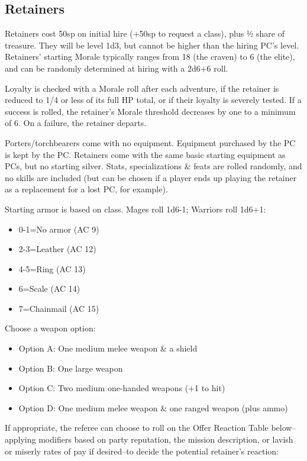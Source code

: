 \documentclass{article}
\begin{document}
\begin{multicols}{2}
\subsection{Retainers}\label{retainers}

Retainers cost 50sp on initial hire (+50sp to request a class), plus ½
share of treasure. They will be level 1d3, but cannot be higher than the
hiring PC's level. Retainers' starting Morale typically ranges from 18
(the craven) to 6 (the elite), and can be randomly determined at hiring
with a 2d6+6 roll.

Loyalty is checked with a Morale roll after each adventure, if the
retainer is reduced to 1/4 or less of its full HP total, or if their
loyalty is severely tested. If a success is rolled, the retainer's
Morale threshold decreases by one to a minimum of 6. On a failure, the
retainer departs.

Porters/torchbearers come with no equipment. Equipment purchased by the
PC is kept by the PC. Retainers come with the same basic starting
equipment as PCs, but no starting silver. Stats, specializations \&
feats are rolled randomly, and no skills are included (but can be chosen
if a player ends up playing the retainer as a replacement for a lost PC,
for example).

Starting armor is based on class. Mages roll 1d6-1; Warriors roll 1d6+1:

\begin{itemize}
\tightlist
\item
  0-1=No armor (AC 9)
\item
  2-3=Leather (AC 12)
\item
  4-5=Ring (AC 13)
\item
  6=Scale (AC 14)
\item
  7=Chainmail (AC 15)
\end{itemize}

Choose a weapon option:

\begin{itemize}
\tightlist
\item
  Option A: One medium melee weapon \& a shield
\item
  Option B: One large weapon
\item
  Option C: Two medium one-handed weapons (+1 to hit)
\item
  Option D: One medium melee weapon \& one ranged weapon (plus ammo)
\end{itemize}

If appropriate, the referee can choose to roll on the Offer Reaction
Table below--applying modifiers based on party reputation, the mission
description, or lavish or miserly rates of pay if desired--to decide the
potential retainer's reaction:


\end{multicols}
\end{document}
